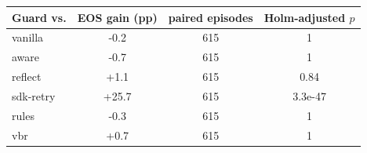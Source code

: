 \begin{tabular}{lccc}
\toprule
Guard vs. & EOS gain (pp) & paired episodes & Holm-adjusted $p$ \\
\midrule
vanilla & -0.2 & 615 & 1 \\
aware & -0.7 & 615 & 1 \\
reflect & +1.1 & 615 & 0.84 \\
sdk-retry & +25.7 & 615 & 3.3e-47 \\
rules & -0.3 & 615 & 1 \\
vbr & +0.7 & 615 & 1 \\
\bottomrule
\end{tabular}